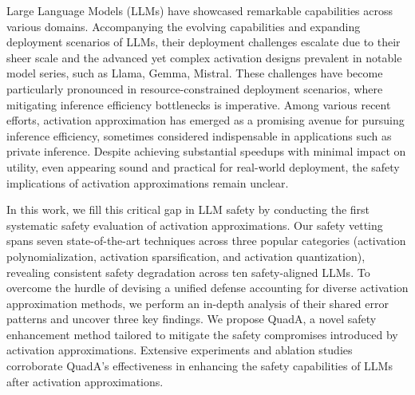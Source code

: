 
Large Language Models (LLMs) have showcased remarkable capabilities across various domains.  Accompanying the evolving capabilities and expanding deployment scenarios of LLMs, their deployment challenges escalate due to their sheer scale and the advanced yet complex activation designs prevalent in notable model series, such as Llama, Gemma, Mistral. These challenges have become particularly pronounced in resource-constrained deployment scenarios, where mitigating inference efficiency bottlenecks is imperative. Among various recent efforts, activation approximation has emerged as a promising avenue for pursuing inference efficiency, sometimes considered indispensable in applications such as private inference. Despite achieving substantial speedups with minimal impact on utility, even appearing sound and practical for real-world deployment, the safety implications of activation approximations remain unclear.

In this work, we fill this critical gap in LLM safety by conducting the first systematic safety evaluation of activation approximations. Our safety vetting spans seven state-of-the-art techniques across three popular categories (activation polynomialization, activation sparsification, and activation quantization), revealing consistent safety degradation across ten safety-aligned LLMs. To overcome the hurdle of devising a unified defense accounting for diverse activation approximation methods, we perform an in-depth analysis of their shared error patterns and uncover three key findings. We propose QuadA, a novel safety enhancement method tailored to mitigate the safety compromises introduced by activation approximations.
Extensive experiments and ablation studies corroborate QuadA’s effectiveness in enhancing the safety capabilities of LLMs after activation approximations.



